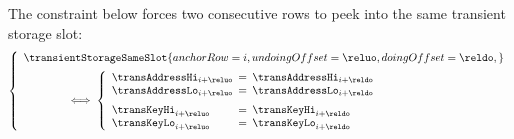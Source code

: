 The constraint below forces two consecutive rows to peek into the same transient storage slot:
\[
	\left\{ \begin{array}{l}
		\transientStorageSameSlot {
			anchorRow     = i      ,
			undoingOffset = \reluo ,
			doingOffset   = \reldo ,
		}
		\vspace{2mm} \\
		\qquad\qquad
		\iff
		\left\{ \begin{array}{lcl}
			\transAddressHi _{i + \reluo} & \!\!\! = \!\!\! & \transAddressHi _{i + \reldo}              \\
			\transAddressLo _{i + \reluo} & \!\!\! = \!\!\! & \transAddressLo _{i + \reldo} \vspace{2mm} \\
			\transKeyHi     _{i + \reluo} & \!\!\! = \!\!\! & \transKeyHi     _{i + \reldo}              \\
			\transKeyLo     _{i + \reluo} & \!\!\! = \!\!\! & \transKeyLo     _{i + \reldo}              \\
		\end{array} \right.
	\end{array} \right.
\]


